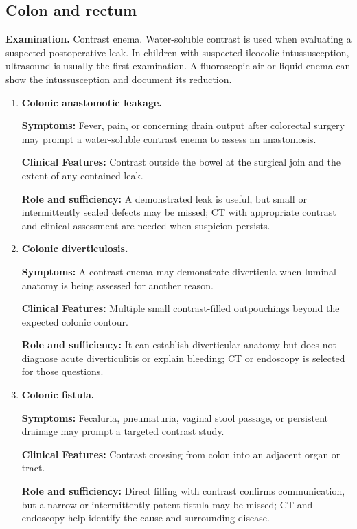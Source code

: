 \subsection{Colon and rectum}
\textbf{Examination.} Contrast enema. Water-soluble contrast is used when evaluating a suspected postoperative leak. In children with suspected ileocolic intussusception, ultrasound is usually the first examination. A fluoroscopic air or liquid enema can show the intussusception and document its reduction.

\begin{enumerate}[leftmargin=*,itemsep=0.45em,topsep=0.4em]
\item \textbf{Colonic anastomotic leakage.}\par\noindent\textbf{Symptoms:} Fever, pain, or concerning drain output after colorectal surgery may prompt a water-soluble contrast enema to assess an anastomosis.\par\noindent\textbf{Clinical Features:} Contrast outside the bowel at the surgical join and the extent of any contained leak.\par\noindent\textbf{Role and sufficiency:} A demonstrated leak is useful, but small or intermittently sealed defects may be missed; CT with appropriate contrast and clinical assessment are needed when suspicion persists.
\item \textbf{Colonic diverticulosis.}\par\noindent\textbf{Symptoms:} A contrast enema may demonstrate diverticula when luminal anatomy is being assessed for another reason.\par\noindent\textbf{Clinical Features:} Multiple small contrast-filled outpouchings beyond the expected colonic contour.\par\noindent\textbf{Role and sufficiency:} It can establish diverticular anatomy but does not diagnose acute diverticulitis or explain bleeding; CT or endoscopy is selected for those questions.
\item \textbf{Colonic fistula.}\par\noindent\textbf{Symptoms:} Fecaluria, pneumaturia, vaginal stool passage, or persistent drainage may prompt a targeted contrast study.\par\noindent\textbf{Clinical Features:} Contrast crossing from colon into an adjacent organ or tract.\par\noindent\textbf{Role and sufficiency:} Direct filling with contrast confirms communication, but a narrow or intermittently patent fistula may be missed; CT and endoscopy help identify the cause and surrounding disease.

\end{enumerate}
